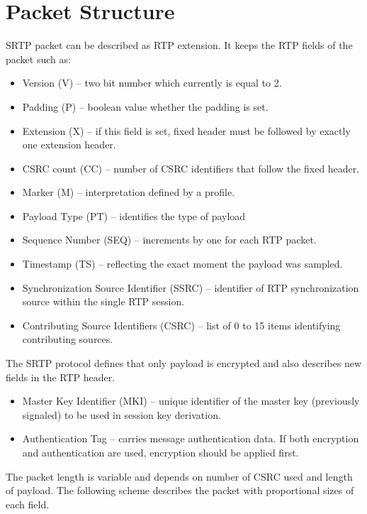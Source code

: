 \section{Packet Structure}
SRTP packet can be described as RTP extension. It keeps the RTP fields of
the packet such as:
\begin{itemize}
\item Version (V) -- two bit number which currently is equal to 2.
\item Padding (P) -- boolean value whether the padding is set.
\item Extension (X) -- if this field is set, fixed header must be followed by
exactly one extension header.
\item CSRC count (CC) -- number of CSRC identifiers that follow the fixed 
header.
\item Marker (M) -- interpretation defined by a profile.
\item Payload Type (PT) -- identifies the type of payload
\item Sequence Number (SEQ) -- increments by one for each RTP packet.
\item Timestamp (TS) -- reflecting the exact moment the payload was sampled.
\item Synchronization Source Identifier (SSRC) -- identifier of RTP 
synchronization source within the single RTP session.
\item Contributing Source Identifiers (CSRC) -- list of 0 to 15 items 
identifying contributing sources.
\end{itemize}

The SRTP protocol defines that only payload is encrypted and also describes new 
fields in the RTP header.

\begin{itemize}
\item Master Key Identifier (MKI) -- unique identifier of the master key 
(previously signaled) to be used in session key derivation.
\item Authentication Tag -- carries message authentication data. If both
encryption and authentication are used, encryption should be applied first.
\end{itemize}

The packet length is variable and depends on number of CSRC used and length
of payload. The following scheme describes the packet with proportional
sizes of each field.

